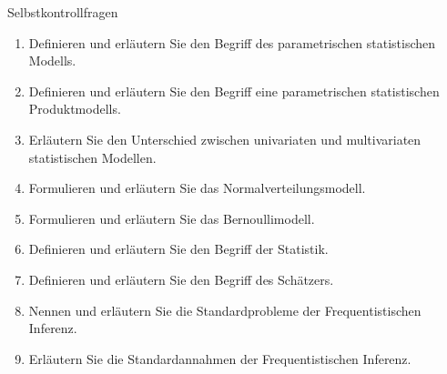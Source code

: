 \documentclass[
  8pt,
  ignorenonframetext,
]{beamer}
\providecommand{\tightlist}{%
  \setlength{\itemsep}{0pt}\setlength{\parskip}{0pt}}
\begin{document}
\begin{frame}{Selbstkontrollfragen}
\protect\hypertarget{selbstkontrollfragen}{}
\small
{}

\begin{enumerate}
\tightlist
\item
  Definieren und erläutern Sie den Begriff des parametrischen
  statistischen Modells.
\item
  Definieren und erläutern Sie den Begriff eine parametrischen
  statistischen Produktmodells.
\item
  Erläutern Sie den Unterschied zwischen univariaten und multivariaten
  statistischen Modellen.
\item
  Formulieren und erläutern Sie das Normalverteilungsmodell.
\item
  Formulieren und erläutern Sie das Bernoullimodell.
\item
  Definieren und erläutern Sie den Begriff der Statistik.
\item
  Definieren und erläutern Sie den Begriff des Schätzers.
\item
  Nennen und erläutern Sie die Standardprobleme der Frequentistischen
  Inferenz.
\item
  Erläutern Sie die Standardannahmen der Frequentistischen Inferenz.
\end{enumerate}
\end{frame}
\end{document}
